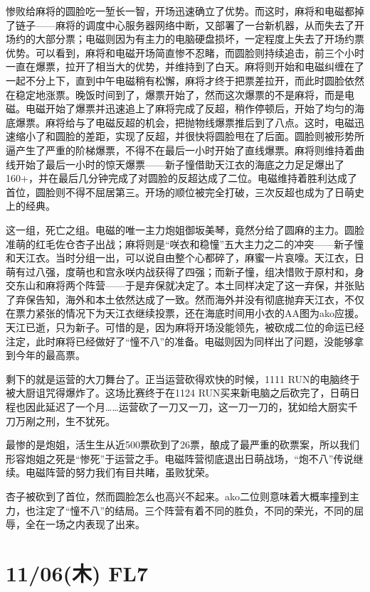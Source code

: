 惨败给麻将的圆脸吃一堑长一智，开场迅速确立了优势。而这时，麻将和电磁都掉了链子——麻将的调度中心服务器网络中断，又部署了一台新机器，从而失去了开场约的大部分票；电磁则因为有主力的电脑硬盘损坏，一定程度上失去了开场约票优势。可以看到，麻将和电磁开场简直惨不忍睹，而圆脸则持续追击，前三个小时一直在爆票，拉开了相当大的优势，并维持到了白天。麻将则开始和电磁纠缠在了一起不分上下，直到中午电磁稍有松懈，麻将才终于把票差拉开，而此时圆脸依然在稳定地涨票。晚饭时间到了，爆票开始了，然而这次爆票的不是麻将，而是电磁。电磁开始了爆票并迅速追上了麻将完成了反超，稍作停顿后，开始了均匀的海底爆票。麻将给与了电磁反超的机会，把抛物线爆票推后到了八点。这时，电磁迅速缩小了和圆脸的差距，实现了反超，并很快将圆脸甩在了后面。圆脸则被形势所逼产生了严重的阶梯爆票，不得不在最后一小时开始了直线爆票。麻将则维持着曲线开始了最后一小时的惊天爆票——新子憧借助天江衣的海底之力足足爆出了160+，并在最后几分钟完成了对圆脸的反超达成了二位。电磁维持着胜利达成了首位，圆脸则不得不屈居第三。开场的顺位被完全打破，三次反超也成为了日萌史上的经典。

这一组，死亡之组。电磁的唯一主力炮姐御坂美琴，竟然分给了圆麻的主力。圆脸准萌的红毛佐仓杏子出战；麻将则是“咲衣和稳憧”五大主力之二的冲突——新子憧和天江衣。当时分组一出，可以说自由整个心都碎了，麻蜜一片哀嚎。天江衣，日萌有过八强，度萌也和宫永咲内战获得了四强；而新子憧，组决惜败于原村和，身交东山和麻将两个阵营——于是弃保就决定了。本土同样决定了这一弃保，并张贴了弃保告知，海外和本土依然达成了一致。然而海外并没有彻底抛弃天江衣，不仅在票力紧张的情况下为天江衣继续投票，还在海底时间用小衣的AA图为ako应援。天江已逝，只为新子。可惜的是，因为麻将开场没能领先，被砍成二位的命运已经注定，此时麻将已经做好了“憧不八”的准备。电磁则因为同样出了问题，没能够拿到今年的最高票。

剩下的就是运营的大刀舞台了。正当运营砍得欢快的时候，1111 RUN的电脑终于被大厨诅咒得爆炸了。这场比赛终于在1124 RUN买来新电脑之后砍完了，日萌日程也因此延迟了一个月……运营砍了一刀又一刀，这一刀一刀的，犹如给大厨实千刀万剐之刑，生不犹死。

最惨的是炮姐，活生生从近500票砍到了26票，酿成了最严重的砍票案，所以我们形容炮姐之死是“惨死”于运营之手。电磁阵营彻底退出日萌战场，“炮不八”传说继续。电磁阵营的努力我们有目共睹，虽败犹荣。

杏子被砍到了首位，然而圆脸怎么也高兴不起来。ako二位则意味着大概率撞到主力，也注定了“憧不八”的结局。三个阵营有着不同的胜负，不同的荣光，不同的屈辱，全在一场之内表现了出来。

\section{11/06(木) FL7}

